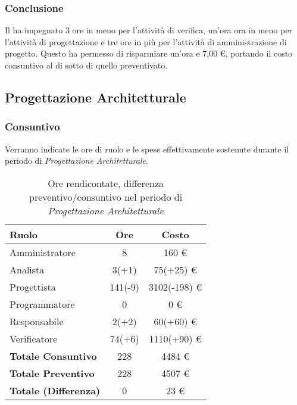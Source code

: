 \subsubsection{Conclusione}
Il  ha impegnato 3 ore in meno per l'attivit\`a di verifica, un'ora ora in meno per l'attivit\`a di progettazione e tre ore in più per l'attivit\`a di amministrazione di progetto. Questo ha permesso di risparmiare un'ora e 7,00 \euro{}, portando il costo consuntivo al di sotto di quello preventivato.

\newpage


\subsection{Progettazione Architetturale}
\subsubsection{Consuntivo}
Verranno indicate le ore di ruolo e le spese effettivamente sostenute durante il periodo di \textit{Progettazione Architetturale}.

\begin{table}[H]
	\centering
	\begin{tabular}{ l c c }
		\textbf{Ruolo} & \textbf{Ore} & \textbf{Costo} \\
		\hline
		Amministratore & 8 & 160 \euro{} \\
		Analista & 3(+1) & 75(+25) \euro{} \\
		Progettista & 141(-9) & 3102(-198) \euro{} \\
		Programmatore & 0 & 0 \euro{} \\
		Responsabile & 2(+2) & 60(+60) \euro{} \\
		Verificatore & 74(+6) & 1110(+90) \euro{} \\
		\hline
		\textbf{Totale Consuntivo} & 228 & 4484 \euro{} \\
		\hline
		\textbf{Totale Preventivo} & 228 & 4507 \euro{} \\
		\hline
		\textbf{Totale (Differenza)} & 0 & 23 \euro{} \\
		\hline
	\end{tabular}
	\caption{Ore rendicontate, differenza preventivo/consuntivo nel periodo di \textit{Progettazione Architetturale}}
\end{table}



